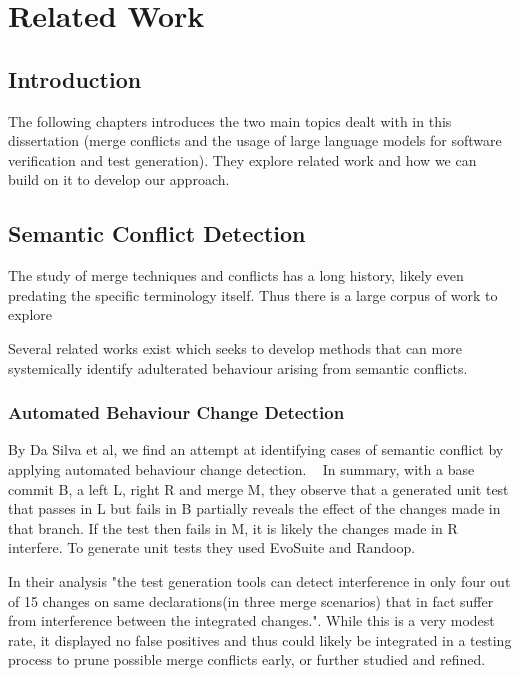 \chapter{Related Work} \label{chap:sota}

\section{Introduction}

 The following chapters introduces the two main topics dealt with in this dissertation (merge conflicts and the usage of large language models for software verification and test generation). They explore related work and how we can build on it to develop our approach.

\section{Semantic Conflict Detection}

The study of merge techniques and conflicts has a long history, likely even predating the specific terminology itself. Thus there is a large corpus of work to explore

Several related works exist which seeks to develop methods that can more systemically identify adulterated behaviour arising from semantic conflicts.

\subsection{Automated Behaviour Change Detection}

By Da Silva et al, we find an attempt at identifying cases of semantic conflict by applying automated behaviour change detection. ~\citep{kn:leuson} In summary, with a base commit B, a left L, right R and merge M, they observe that a generated unit test that passes in L but fails in B partially reveals the effect of the changes made in that branch. If the test then fails in M, it is likely the changes made in R interfere. To generate unit tests they used EvoSuite and Randoop. ~\citep{kn:randoop}
~\citep{kn:evosuite}

In their analysis "the test generation tools can detect interference in only four out of 15 changes on same declarations(in three merge scenarios) that in fact suffer from interference between the integrated changes.". While this is a very modest rate, it displayed no false positives and thus could likely be integrated in a testing process to prune possible merge conflicts early, or further studied and refined.



